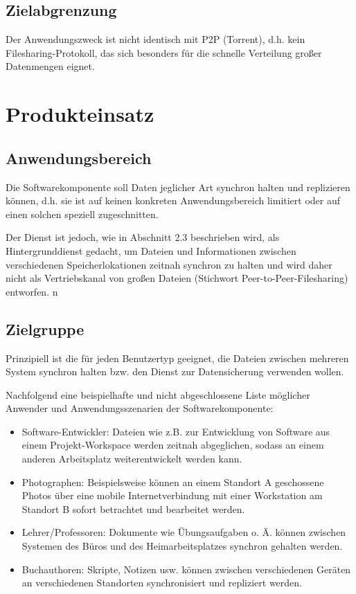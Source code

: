 \documentclass[12pt,oneside,a4paper,bibtotoc,liststotoc,pointlessnumbers]{scrartcl}
\begin{document}
\subsection{Zielabgrenzung}
Der Anwendungszweck ist nicht identisch mit P2P (Torrent), d.h. kein Filesharing-Protokoll, das sich besonders für die schnelle Verteilung großer Datenmengen eignet.
\newpage
\section{Produkteinsatz}
\subsection{Anwendungsbereich}
Die Softwarekomponente soll Daten jeglicher Art synchron halten und replizieren können, d.h. sie ist auf keinen konkreten Anwendungsbereich limitiert oder auf einen solchen speziell zugeschnitten.\par
Der Dienst ist jedoch, wie in Abschnitt 2.3 beschrieben wird, als Hintergrunddienst gedacht, um Dateien und Informationen zwischen verschiedenen Speicherlokationen zeitnah synchron zu halten und wird daher nicht als Vertriebskanal von großen Dateien (Stichwort Peer-to-Peer-Filesharing) entworfen. n
\subsection{Zielgruppe}
Prinzipiell ist die für jeden Benutzertyp geeignet, die Dateien zwischen mehreren System synchron halten bzw. den Dienst zur Datensicherung verwenden wollen.\par
Nachfolgend eine beispielhafte und nicht abgeschlossene Liste möglicher Anwender und Anwendungsszenarien der Softwarekomponente:
\begin{itemize}
	\item Software-Entwickler: Dateien wie z.B. zur Entwicklung von Software aus einem Projekt-Workspace werden zeitnah abgeglichen, sodass an einem anderen Arbeitsplatz weiterentwickelt werden kann.
	\item Photographen: Beispielsweise können an einem Standort A geschossene Photos über eine mobile Internetverbindung mit einer Workstation am Standort B sofort betrachtet und bearbeitet werden. 
	\item Lehrer/Professoren: Dokumente wie Übungsaufgaben o. Ä. können zwischen Systemen des Büros und des Heimarbeitsplatzes synchron gehalten werden.
	\item Buchauthoren: Skripte, Notizen usw. können zwischen verschiedenen Geräten an verschiedenen Standorten synchronisiert und repliziert werden. 
\end{itemize}
\end{document}
